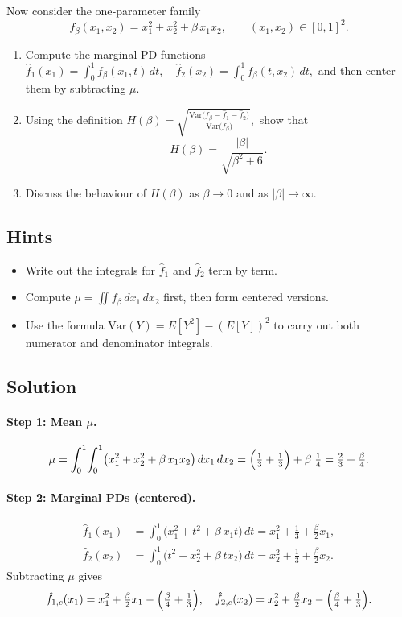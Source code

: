 \documentclass[a4paper]{article}
\begin{document}
Now consider the one‐parameter family
\[
f_\beta(x_1,x_2)=x_1^2 + x_2^2 + \beta\,x_1x_2,
\qquad (x_1,x_2)\in[0,1]^2.
\]
\begin{enumerate}%
  \item Compute the marginal PD functions
        \(
          \hat f_{1}(x_1)
          =\int_0^1 f_\beta(x_1,t)\,dt,
          \quad
          \hat f_{2}(x_2)
          =\int_0^1 f_\beta(t,x_2)\,dt,
        \)
        and then center them by subtracting $\mu$.
  \item Using the definition
        \(
          H(\beta)
          =\sqrt{\frac{\text{Var}\bigl(f_\beta-\hat f_1-\hat f_2\bigr)}
                     {\text{Var}\bigl(f_\beta\bigr)}},
        \)
        show that
        \[
          H(\beta)
          =\frac{|\beta|}{\sqrt{\beta^2 + 6}}.
        \]
  \item Discuss the behaviour of $H(\beta)$ as $\beta\to0$ and as $|\beta|\to\infty$.
\end{enumerate}

\subsection*{Hints}
\begin{itemize}
  \item Write out the integrals for $\hat f_1$ and $\hat f_2$ term by term.
  \item Compute $\mu=\iint f_\beta\,dx_1\,dx_2$ first, then form centered versions.
  \item Use the formula $\text{Var}(Y)=E[Y^2] - (E[Y])^2$ to carry out both numerator and denominator integrals.
\end{itemize}

\subsection*{Solution}

\paragraph{Step 1: Mean $\mu$.}
\[
\mu
= \int_0^1\!\int_0^1 \bigl(x_1^2 + x_2^2 + \beta\,x_1x_2\bigr)\,dx_1\,dx_2
= \Bigl(\tfrac13+\tfrac13\Bigr) + \beta\;\tfrac14
= \tfrac23 + \tfrac{\beta}{4}.
\]

\paragraph{Step 2: Marginal PDs (centered).}
\[
\begin{aligned}
\hat f_{1}(x_1)
&= \int_0^1 \bigl(x_1^2 + t^2 + \beta\,x_1 t\bigr)\,dt
= x_1^2 + \tfrac13 + \tfrac{\beta}{2}x_1,\\
\hat f_{2}(x_2)
&= \int_0^1 \bigl(t^2 + x_2^2 + \beta\,t x_2\bigr)\,dt
= x_2^2 + \tfrac13 + \tfrac{\beta}{2}x_2.
\end{aligned}
\]
Subtracting $\mu$ gives
\[
\hat f_{1,c}(x_1)
= x_1^2 + \tfrac{\beta}{2}x_1 - \Bigl(\tfrac{\beta}{4} + \tfrac13\Bigr),
\quad
\hat f_{2,c}(x_2)
= x_2^2 + \tfrac{\beta}{2}x_2 - \Bigl(\tfrac{\beta}{4} + \tfrac13\Bigr).
\]
\end{document}
